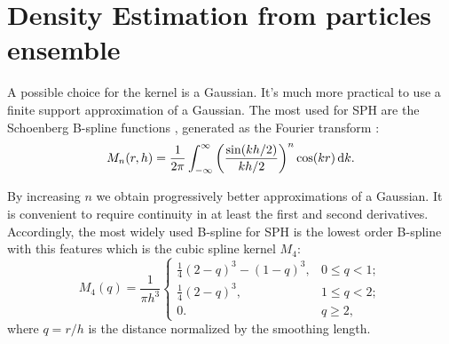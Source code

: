 





\section{Density Estimation from particles ensemble}
A possible choice for the kernel is a Gaussian.
It's much more practical to use a finite support approximation of a Gaussian.
The most used for SPH are the Schoenberg  B-spline functions \citep{Schoenberg1988}, generated as the Fourier transform \citep{Price2012}:
\begin{equation}
M_n(r, h) = \frac{1}{2\pi}\int_{-\infty}^{\infty}{\left(\frac{\sin(kh/2)}{kh/2}\right)^n\cos(kr)\operatorname{d}\!{k}}.
\end{equation}

By increasing $n$ we obtain progressively better approximations of a Gaussian.
It is convenient to require continuity in at least the first and second derivatives.
Accordingly, the most widely used B-spline for SPH is the lowest order B-spline with this features which is the cubic spline kernel $M_4$:
\begin{equation}
M_4(q) = \frac{1}{\pi h^3} \left\{
\begin{array}{ll}
\frac{1}{4}(2-q)^3 - (1 - q)^{3}, & 0 \le q < 1; \\
\frac{1}{4}(2-q)^3, & 1 \le q < 2; \\
0. & q \ge 2,
\end{array}
\right.
\label{eq:cubicspline}
\end{equation}
where $q=r/h$ is the distance normalized by the smoothing length.

